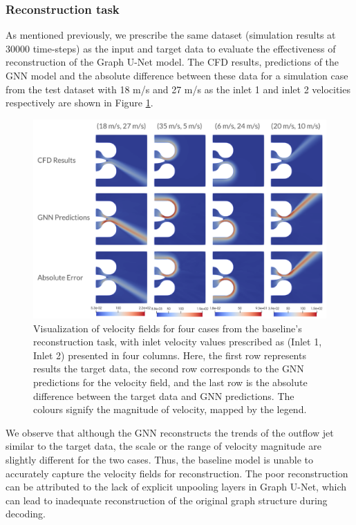 \subsubsection{Reconstruction task}
As mentioned previously, we prescribe the same dataset (simulation results at 30000 time-steps) as the input and target data to evaluate the effectiveness of reconstruction of the Graph U-Net model. The CFD results, predictions of the GNN model and the absolute difference between these data for a simulation case from the test dataset with 18 m/s and 27 m/s as the inlet 1 and inlet 2 velocities respectively are shown in Figure \ref{blrecon}.
\begin{figure}[ht]
    \centering
    \includegraphics[width=14cm]{images/Methodology/allvelrecon.png}
    \caption{Visualization of velocity fields for four cases from the baseline's reconstruction task, with inlet velocity values prescribed as (Inlet 1, Inlet 2) presented in four columns. Here, the first row represents results the target data, the second row corresponds to the GNN predictions for the velocity field, and the last row is the absolute difference between the target data and GNN predictions. The colours signify the magnitude of velocity, mapped by the legend.} 
    \label{blrecon}
\end{figure}
We observe that although the GNN reconstructs the trends of the outflow jet similar to the target data, the scale or the range of velocity magnitude are slightly different for the two cases. Thus, the baseline model is unable to accurately capture the velocity fields for reconstruction. The poor reconstruction can be attributed to the lack of explicit unpooling layers in Graph U-Net, which can lead to inadequate reconstruction of the original graph structure during decoding. 
